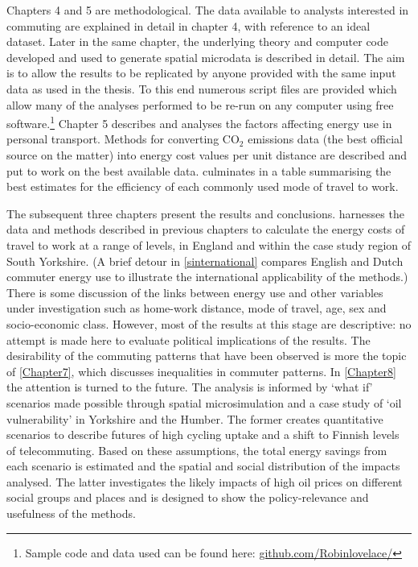 \documentclass[a4paper, 11pt, twoside]{Thesis}
\begin{document}
Chapters 4 and 5 are methodological. The data available to analysts interested
in commuting are explained in detail in chapter 4, with reference to an ideal
dataset. Later in the same chapter, the underlying theory and computer code
developed and
used to generate spatial microdata is described in detail. The aim is to allow the
results to be replicated by anyone provided with the same input data as used in
the thesis. To this end numerous script files are provided which allow many
of the analyses performed to be re-run on any computer using free
software.\footnote{Sample code
and data used can be found here: {\color{blue}
\href{https://github.com/Robinlovelace/}
{github.com/Robinlovelace/}}
}
Chapter 5 describes and analyses the factors affecting energy use in personal
transport. Methods for converting CO$_2$ emissions data (the best official
source on the matter) into energy cost values per unit distance are described
and put to work on the best available data. 
culminates in a table summarising the best estimates for the
efficiency of each commonly used mode of travel to work.

The subsequent three chapters present the results and conclusions.
 harnesses the data and methods described in
previous chapters to
calculate the energy costs of travel to work at a range of levels, in England
and within the case study region of South Yorkshire. (A brief detour in
\cref{sinternational} compares English and Dutch commuter energy use
to illustrate the international applicability of the methods.) There is some discussion
of the links between energy use and other variables under investigation such as
home-work distance, mode of travel, age, sex and socio-economic class. However,
most of the results at this stage are descriptive: no
attempt is made here to evaluate political implications of the results. The
desirability of the commuting patterns that have been observed is more the
topic of \cref{Chapter7}, which discusses inequalities in commuter patterns.
In \cref{Chapter8} the attention is turned to the future. The analysis
is informed by `what if' scenarios made possible through spatial microsimulation
and a case study of `oil vulnerability' in Yorkshire and the
Humber.
The former creates quantitative scenarios to describe futures
of high cycling uptake and a shift to Finnish levels of telecommuting.
Based on these assumptions, the total energy savings from each scenario is
estimated and the spatial and social distribution of the impacts
analysed. 
The latter investigates the likely impacts of high oil prices on
different social groups and places and is designed to show the policy-relevance
and usefulness of the methods.
\end{document}
